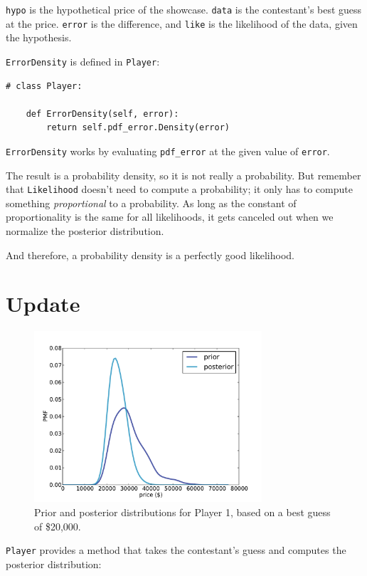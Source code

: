 \documentclass[12pt]{book}
\begin{document}
{\tt hypo} is the hypothetical price of the showcase.  {\tt data}
is the contestant's best guess at the price.  {\tt error} is
the difference, and {\tt like} is the likelihood of the data,
given the hypothesis.

{\tt ErrorDensity} is defined in {\tt Player}:

\begin{verbatim}
# class Player:

    def ErrorDensity(self, error):
        return self.pdf_error.Density(error)
\end{verbatim}

{\tt ErrorDensity} works by evaluating \verb"pdf_error" at
the given value of {\tt error}.

The result is a probability density, so it is not really a probability.
But remember that {\tt Likelihood} doesn't
need to compute a probability; it only has to compute something {\em
  proportional} to a probability.  As long as the constant of
proportionality is the same for all likelihoods, it gets canceled out
when we normalize the posterior distribution.

And therefore, a probability density is a perfectly good likelihood.


\section{Update}

\begin{figure}
\centerline{\includegraphics[height=2.5in]{figs/price3.pdf}}
\caption{Prior and posterior distributions for Player 1, based on
  a best guess of \$20,000.}
\label{fig.price3}
\end{figure}


{\tt Player} provides a method that takes the contestant's
guess and computes the posterior distribution:
\end{document}

